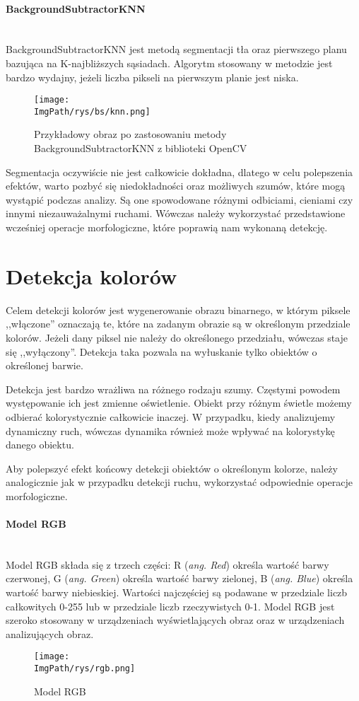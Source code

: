 \documentclass[a4paper,12pt,twoside,openany]{report}
\newcommand{\ImgPath}{.}
\begin{document}
\paragraph{BackgroundSubtractorKNN} \mbox{} \\
 \indent
 BackgroundSubtractorKNN jest metodą segmentacji tła oraz pierwszego planu bazująca na K-najbliższych sąsiadach. Algorytm stosowany w metodzie jest bardzo wydajny, jeżeli liczba pikseli na pierwszym planie jest niska\cite{KNN}. 

\begin{figure}[H]	
	\centering
	\texttt{[image: \\ImgPath/rys/bs/knn.png]}
	
	\caption{Przykładowy obraz po zastosowaniu metody BackgroundSubtractorKNN z biblioteki OpenCV}
\end{figure}
 
 Segmentacja oczywiście nie jest całkowicie dokładna, dlatego w celu polepszenia efektów, warto pozbyć się niedokładności oraz możliwych szumów,  które mogą wystąpić podczas analizy. Są one spowodowane różnymi odbiciami, cieniami czy innymi niezauważalnymi ruchami. Wówczas należy wykorzystać przedstawione wcześniej operacje morfologiczne, które poprawią nam wykonaną detekcję.

\section{Detekcja kolorów}
Celem detekcji kolorów jest wygenerowanie obrazu binarnego, w którym piksele ,,włączone'' oznaczają te, które na zadanym obrazie są w określonym przedziale kolorów. Jeżeli dany piksel nie należy do określonego  przedziału, wówczas staje się ,,wyłączony''. Detekcja taka pozwala na wyłuskanie tylko obiektów o określonej barwie.

Detekcja jest bardzo wrażliwa na różnego rodzaju szumy. Częstymi powodem występowanie ich jest zmienne oświetlenie. Obiekt przy różnym świetle możemy odbierać kolorystycznie całkowicie inaczej. W przypadku, kiedy analizujemy dynamiczny ruch, wówczas dynamika również może wpływać na kolorystykę danego obiektu.  

Aby polepszyć efekt końcowy detekcji obiektów o określonym kolorze, należy analogicznie jak w przypadku detekcji ruchu, wykorzystać odpowiednie operacje morfologiczne. 

\paragraph{Model RGB} \mbox{} \\
\indent
Model RGB składa się z trzech części: R (\textit{ang. Red}) określa wartość barwy czerwonej, G (\textit{ang. Green}) określa wartość barwy zielonej, B (\textit{ang. Blue}) określa wartość barwy niebieskiej. Wartości najczęściej są podawane w przedziale liczb całkowitych 0-255 lub w przedziale liczb rzeczywistych 0-1. Model RGB jest szeroko stosowany w urządzeniach wyświetlających obraz oraz w urządzeniach analizujących obraz.
\begin{figure}[H]	
	\centering
	\texttt{[image: \\ImgPath/rys/rgb.png]}
	
	\caption{Model RGB}
\end{figure}
\end{document}
